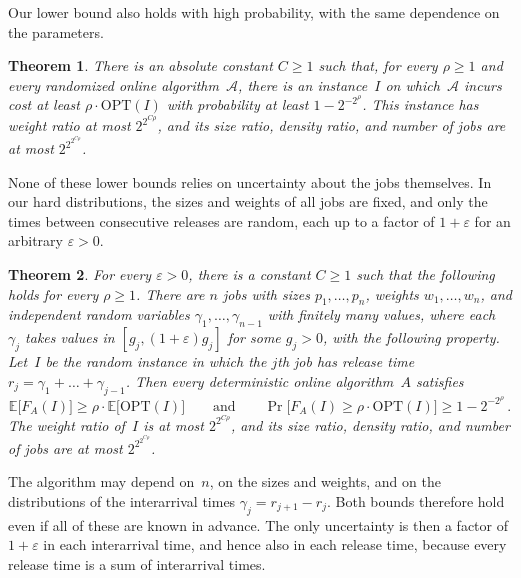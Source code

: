 \documentclass[11pt,letterpaper]{article}
\newtheorem{theorem}{Theorem}[section]
\theoremstyle{definition}
\theoremstyle{remark}
\newcommand{\OPT}{{\mathrm{OPT}}}
\newcommand{\eps}{\varepsilon}
\newcommand{\E}{\mathbb{E}}
\newcommand{\cA}{\mathcal{A}}
\begin{document}
Our lower bound also holds with high probability, with the same dependence on the parameters.

\begin{theorem}\label{thm:probability}
There is an absolute constant $C\ge1$ such that, for every $\rho\ge1$ and every randomized online algorithm~$\cA$, there is an instance~$I$ on which~$\cA$ incurs cost at least $\rho\cdot\OPT(I)$ with probability at least $1-2^{-2^\rho}$. This instance has weight ratio at most $2^{2^{C\rho}}$, and its size ratio, density ratio, and number of jobs are at most $2^{2^{2^{C\rho}}}$.
\end{theorem}

None of these lower bounds relies on uncertainty about the jobs themselves. In our hard distributions, the sizes and weights of all jobs are fixed, and only the times between consecutive releases are random, each up to a factor of $1+\eps$ for an arbitrary $\eps>0$.

\begin{theorem}\label{thm:interarrival}
For every $\eps>0$, there is a constant $C\ge1$ such that the following holds for every $\rho\ge1$. There are $n$ jobs with sizes $p_1,\dots,p_n$, weights $w_1,\dots,w_n$, and independent random variables $\gamma_1,\dots,\gamma_{n-1}$ with finitely many values, where each~$\gamma_j$ takes values in $[g_j,(1+\eps)g_j]$ for some $g_j>0$, with the following property. Let~$I$ be the random instance in which the $j$th job has release time $r_j=\gamma_1+\dots+\gamma_{j-1}$. Then every deterministic online algorithm~$A$ satisfies
\begin{equation*}
  \E\bigl[F_A(I)\bigr]\ge\rho\cdot\E\bigl[\OPT(I)\bigr]
  \qquad\text{and}\qquad
  \Pr\bigl[F_A(I)\ge\rho\cdot \OPT(I)\bigr]\ge1-2^{-2^\rho}\,.
\end{equation*}
The weight ratio of~$I$ is at most $2^{2^{C\rho}}$, and its size ratio, density ratio, and number of jobs are at most $2^{2^{2^{C\rho}}}$.
\end{theorem}

The algorithm may depend on~$n$, on the sizes and weights, and on the distributions of the interarrival times $\gamma_j=r_{j+1}-r_j$. Both bounds therefore hold even if all of these are known in advance. The only uncertainty is then a factor of $1+\eps$ in each interarrival time, and hence also in each release time, because every release time is a sum of interarrival times. %
\end{document}
